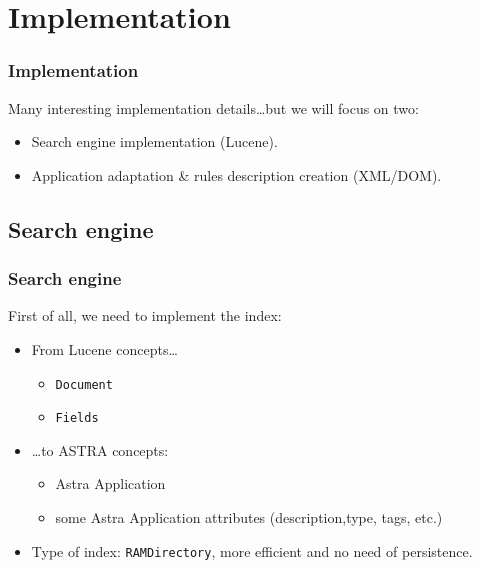 \section{Implementation}

\begin{frame}
\frametitle{Implementation}
	
	Many interesting implementation details\ldots but we will focus on two:
	\begin{itemize}
		\item Search engine implementation (Lucene).
		\item Application adaptation \& rules description creation (XML/DOM).
	\end{itemize}

\end{frame}

\subsection{Search engine}

\begin{frame}
\frametitle{Search engine}

	First of all, we need to implement the index:
	\begin{itemize}
      	\item From Lucene concepts\ldots 
		\begin{itemize}
      		\item \texttt{Document}
      		\item \texttt{Fields}
        \end{itemize}
        
        \item \ldots to ASTRA concepts: 
		\begin{itemize}
      		\item Astra Application
      		\item some Astra Application attributes (description,type, tags, etc.)
        \end{itemize}
        \item Type of index: \texttt{RAMDirectory}, more efficient and no need
        of persistence.
    \end{itemize}
\end{frame}  
    
